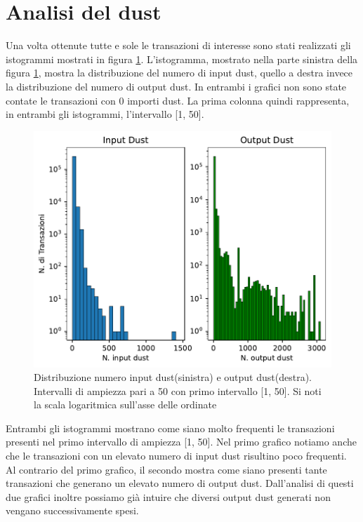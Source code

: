 \section{Analisi del dust}
Una volta ottenute tutte e sole le transazioni di interesse sono stati realizzati gli istogrammi mostrati in figura \ref{fig:dust_distribuzione}. L'istogramma, mostrato nella parte sinistra della figura \ref{fig:dust_distribuzione}, mostra la distribuzione del numero di input dust, quello a destra invece la distribuzione del numero di output dust. In entrambi i grafici non sono state contate le transazioni con 0 importi dust. La prima colonna quindi rappresenta, in entrambi gli istogrammi, l'intervallo [1, 50].
\begin{figure}[h!]
    \centering
    \includegraphics[scale=0.9]{Grafici/distribuzione_dust.pdf}
    \caption{Distribuzione numero input dust(sinistra) e output dust(destra). Intervalli di ampiezza pari a 50 con primo intervallo [1, 50]. Si noti la scala logaritmica sull'asse delle ordinate}
    \label{fig:dust_distribuzione}
\end{figure}
\FloatBarrier 
Entrambi gli istogrammi mostrano come siano molto frequenti le transazioni presenti nel primo intervallo di ampiezza [1, 50]. Nel primo grafico notiamo anche che le transazioni con un elevato numero di input dust risultino poco frequenti. Al contrario del primo grafico, il secondo mostra come siano presenti tante transazioni che generano un elevato numero di output dust. Dall'analisi di questi due grafici inoltre possiamo già intuire che diversi output dust generati non vengano successivamente spesi.

